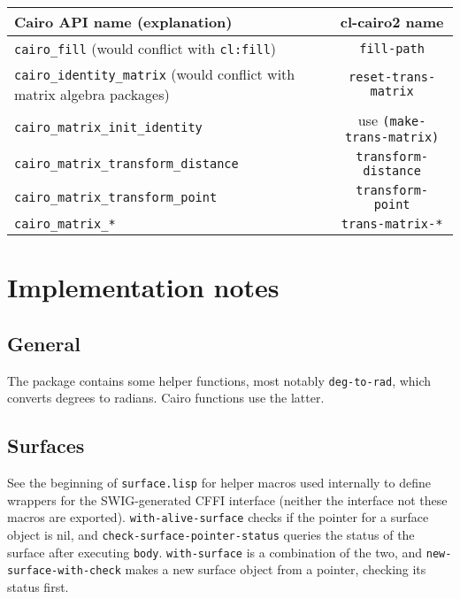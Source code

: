 \documentclass[12pt,letterpaper,dvipdfm]{article}
\begin{document}
\begin{table}[htbp]
  \centering
  \begin{tabular}{p{11cm}|c}
    Cairo API name (explanation) & cl-cairo2 name\\\hline
    \verb!cairo_fill! (would conflict with \lstinline!cl:fill!) 
    & \lstinline!fill-path! \\
    \verb!cairo_identity_matrix! (would
    conflict with matrix algebra packages)& \lstinline!reset-trans-matrix! \\
    \verb!cairo_matrix_init_identity! & use \lstinline!(make-trans-matrix)!\\
    \verb!cairo_matrix_transform_distance! 
    & \lstinline!transform-distance!\\
    \verb!cairo_matrix_transform_point! &
    \lstinline!transform-point!\\
    \verb!cairo_matrix_*! & \lstinline!trans-matrix-*!
  \end{tabular}
  \label{tab:naming}
\end{table}



\section{Implementation notes}
\label{sec:implementation-notes}

\subsection{General}
\label{sec:general}

The package contains some helper functions, most notably
\lstinline{deg-to-rad}, which converts degrees to radians.  Cairo
functions use the latter.

\subsection{Surfaces}
\label{sec:surfaces}

See the beginning of \verb!surface.lisp! for helper macros used
internally to define wrappers for the SWIG-generated CFFI interface
(neither the interface not these macros are exported).
\lstinline!with-alive-surface! checks if the pointer for a surface
object is nil, and \lstinline!check-surface-pointer-status! queries
the status of the surface after executing \lstinline!body!.
\lstinline!with-surface! is a combination of the two, and
\lstinline!new-surface-with-check! makes a new surface object from a
pointer, checking its status first.
\end{document}
